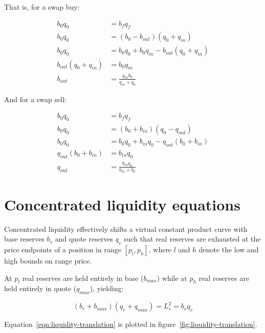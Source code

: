 \documentclass[table, twocolumn]{article}
\begin{document}
That is, for a swap buy:

\begin{align} \label{eqn:b-out-simple}
  b_0 q_0               & = b_f q_f         \nonumber                              \\
  b_0 q_0               & = (b_0 - b_{out})(q_0 + q_{in}) \nonumber                \\
  b_0 q_0               & = b_0 q_0 + b_0 q_{in} - b_{out}(q_0 + q_{in}) \nonumber \\
  b_{out}(q_0 + q_{in}) & = b_{0} q_{in} \nonumber                                 \\
  b_{out}               & = \frac{q_{in} b_0}{q_{in} + q_0}
\end{align}

And for a swap sell:

\begin{align} \label{eqn:q-out-simple}
  b_0 q_0               & = b_f q_f         \nonumber                              \\
  b_0 q_0               & = (b_0 + b_{in})(q_0 - q_{out}) \nonumber                \\
  b_0 q_0               & = b_0 q_0 + b_{in} q_0 - q_{out}(b_0 + b_{in}) \nonumber \\
  q_{out}(b_0 + b_{in}) & = b_{in} q_0 \nonumber                                   \\
  q_{out}               & = \frac{b_{in} q_0}{b_{in} + b_0}
\end{align}

\section{Concentrated liquidity equations}

Concentrated liquidity effectively shifts a virtual constant product curve with base reserves $b_v$
and quote reserves $q_v$ such that real reserves are exhausted at the price endpoints of a position
in range $[p_l, p_h]$, where $l$ and $h$ denote the low and high bounds on range price.

At $p_l$ real reserves are held entirely in base ($b_{max}$) while at $p_h$ real reserves are held
entirely in quote ($q_{max}$), yielding:

\begin{equation} \label{eqn:liquidity-translation}
  (b_r + b_{max})(q_r + q_{max}) = L_v^2 = b_v q_v
\end{equation}

Equation~\ref{eqn:liquidity-translation} is plotted in figure~\ref{fig:liquidity-translation}.
\end{document}
